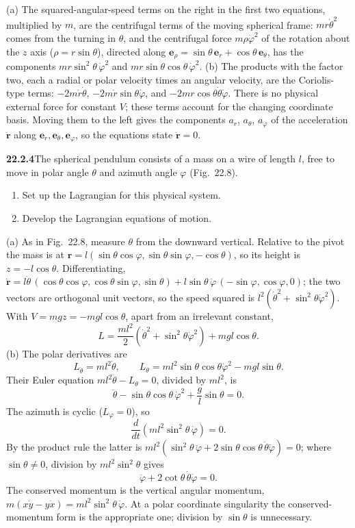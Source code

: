 (a) The squared-angular-speed terms on the right in the first two
equations, multiplied by $m$, are the centrifugal terms of the moving
spherical frame: $mr\dot\theta^2$ comes from the turning in $\theta$,
and the centrifugal force $m\rho\dot\varphi^2$ of the rotation about
the $z$ axis ($\rho=r\sin\theta$), directed along
$\mathbf e_\rho=\sin\theta\,\mathbf e_r+\cos\theta\,\mathbf e_\theta$,
has the components $mr\sin^2\theta\,\dot\varphi^2$ and
$mr\sin\theta\cos\theta\,\dot\varphi^2$.
(b) The products with the factor two, each a radial or polar velocity
times an angular velocity, are the Coriolis-type terms:
$-2m\dot r\dot\theta$, $-2m\dot r\sin\theta\dot\varphi$,
and $-2mr\cos\theta\dot\theta\dot\varphi$.
There is no physical external force for constant $V$; these terms
account for the changing coordinate basis. Moving them to the left
gives the components $a_r$, $a_\theta$, $a_\varphi$ of the acceleration
$\ddot{\mathbf r}$ along $\mathbf e_r,\mathbf e_\theta,\mathbf e_\varphi$,
so the equations state $\ddot{\mathbf r}=0$.


\par\bigskip
\noindent\textbf{22.2.4}\quad The spherical pendulum consists of a
mass on a wire of length $l$, free to move in polar angle
$\theta$ and azimuth angle $\varphi$ (Fig.~22.8).
\begin{enumerate}
\item[(a)] Set up the Lagrangian for this physical system.
\item[(b)] Develop the Lagrangian equations of motion.
\end{enumerate}
\solution
(a) As in Fig.~22.8, measure $\theta$ from the downward vertical.
Relative to the pivot the mass is at
$\mathbf r=l(\sin\theta\cos\varphi,\sin\theta\sin\varphi,-\cos\theta)$,
so its height is $z=-l\cos\theta$. Differentiating,
$\dot{\mathbf r}=l\dot\theta\,(\cos\theta\cos\varphi,\cos\theta\sin\varphi,
\sin\theta)+l\sin\theta\,\dot\varphi\,(-\sin\varphi,\cos\varphi,0)$; the two
vectors are orthogonal unit vectors, so the speed squared is
$l^2(\dot\theta^2+\sin^2\theta\dot\varphi^2)$.
With $V=mgz=-mgl\cos\theta$, apart from an irrelevant constant,
\[
\boxed{L=\frac{ml^2}{2}
(\dot\theta^2+\sin^2\theta\dot\varphi^2)+mgl\cos\theta}.
\]
(b) The polar derivatives are
\[
L_{\dot\theta}=ml^2\dot\theta,\qquad
L_\theta=ml^2\sin\theta\cos\theta\dot\varphi^2-mgl\sin\theta.
\]
Their Euler equation $ml^2\ddot\theta-L_\theta=0$, divided by $ml^2$, is
\[
\boxed{\ddot\theta-\sin\theta\cos\theta\,\dot\varphi^2
+\frac gl\sin\theta=0}.
\]
The azimuth is cyclic ($L_\varphi=0$), so
\[
\boxed{\frac d{dt}(ml^2\sin^2\theta\,\dot\varphi)=0}.
\]
By the product rule the latter is
$ml^2(\sin^2\theta\,\ddot\varphi
+2\sin\theta\cos\theta\,\dot\theta\dot\varphi)=0$; where
$\sin\theta\ne0$, division by $ml^2\sin^2\theta$ gives
\[
\ddot\varphi+2\cot\theta\,\dot\theta\dot\varphi=0.
\]
The conserved momentum is the vertical angular momentum,
$m(x\dot y-y\dot x)=ml^2\sin^2\theta\,\dot\varphi$.
At a polar coordinate singularity the conserved-momentum form is the
appropriate one; division by $\sin\theta$ is unnecessary.


